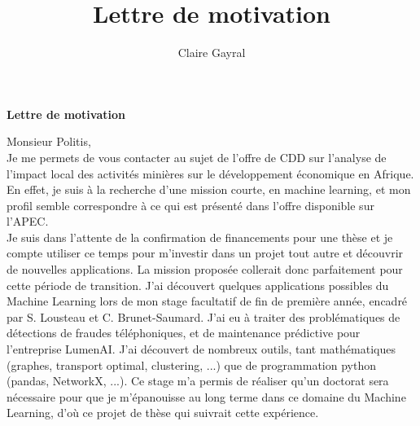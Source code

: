 \documentclass[a4paper,11pt]{article}
\title{Lettre de motivation}
\author{Claire Gayral}
\date{}
\begin{document}
{\centering \Large \bf Lettre de motivation \\ \vspace{0.6cm} }

Monsieur Politis,\\

Je me permets de vous contacter au sujet de l'offre de CDD sur l'analyse de l’impact local des activités minières sur le développement économique en Afrique. En effet, je suis à la recherche d'une mission courte, en machine learning, et mon profil semble correspondre à ce qui est présenté dans l'offre disponible sur l'APEC. \\

Je suis dans l'attente de la confirmation de financements pour une thèse %
 et je compte utiliser ce temps pour m'investir dans un projet tout autre et découvrir de nouvelles applications.  %
La mission proposée collerait donc parfaitement pour cette période de transition. %
J'ai découvert quelques applications possibles du Machine Learning lors de mon stage facultatif de fin de première année, encadré par S. Lousteau et C. Brunet-Saumard.
J'ai eu à traiter des problématiques de détections de fraudes téléphoniques, et de maintenance prédictive pour l'entreprise LumenAI. J'ai découvert de nombreux outils, tant mathématiques (graphes, transport optimal, clustering, ...) que de programmation python (pandas, NetworkX, ...). 
Ce stage m'a permis de réaliser qu'un doctorat sera nécessaire pour que je m'épanouisse au long terme dans ce domaine du Machine Learning, 
%
d'où ce projet de thèse qui suivrait cette expérience. 

\end{document}
